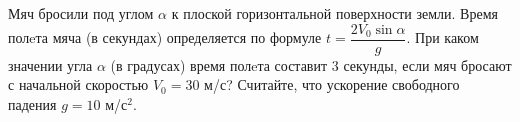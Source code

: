 \begin{ex}
	\begin{condition}
		Мяч бросили под углом \( \alpha \) к плоской горизонтальной поверхности земли. Время полeта мяча (в секундах) определяется по формуле \( t=\dfrac{2V_0\sin\alpha}{g} \). При каком значении угла \( \alpha \) (в градусах) время полeта составит \( 3 \) секунды, если мяч бросают с начальной скоростью \( V_0=30 \) м/с? Считайте, что ускорение свободного падения \( g=10 \) м/с\( ^2 \).
	\end{condition}
	\answer{\( 30\degree \)}
\end{ex}